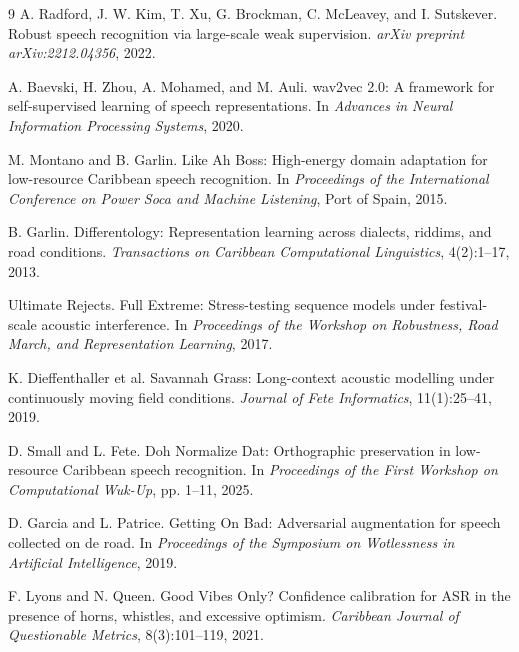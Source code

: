 \documentclass[10pt,twocolumn]{article}
\begin{document}
\balance
\begin{thebibliography}{9}
A. Radford, J. W. Kim, T. Xu, G. Brockman, C. McLeavey, and I. Sutskever.
\newblock Robust speech recognition via large-scale weak supervision.
\newblock \emph{arXiv preprint arXiv:2212.04356}, 2022.

A. Baevski, H. Zhou, A. Mohamed, and M. Auli.
\newblock wav2vec 2.0: A framework for self-supervised learning of speech representations.
\newblock In \emph{Advances in Neural Information Processing Systems}, 2020.

M. Montano and B. Garlin.
\newblock Like Ah Boss: High-energy domain adaptation for low-resource Caribbean speech recognition.
\newblock In \emph{Proceedings of the International Conference on Power Soca and Machine Listening}, Port of Spain, 2015.

B. Garlin.
\newblock Differentology: Representation learning across dialects, riddims, and road conditions.
\newblock \emph{Transactions on Caribbean Computational Linguistics}, 4(2):1--17, 2013.

Ultimate Rejects.
\newblock Full Extreme: Stress-testing sequence models under festival-scale acoustic interference.
\newblock In \emph{Proceedings of the Workshop on Robustness, Road March, and Representation Learning}, 2017.

K. Dieffenthaller et al.
\newblock Savannah Grass: Long-context acoustic modelling under continuously moving field conditions.
\newblock \emph{Journal of Fete Informatics}, 11(1):25--41, 2019.

D. Small and L. Fete.
\newblock Doh Normalize Dat: Orthographic preservation in low-resource Caribbean speech recognition.
\newblock In \emph{Proceedings of the First Workshop on Computational Wuk-Up}, pp. 1--11, 2025.

D. Garcia and L. Patrice.
\newblock Getting On Bad: Adversarial augmentation for speech collected on de road.
\newblock In \emph{Proceedings of the Symposium on Wotlessness in Artificial Intelligence}, 2019.

F. Lyons and N. Queen.
\newblock Good Vibes Only? Confidence calibration for ASR in the presence of horns, whistles, and excessive optimism.
\newblock \emph{Caribbean Journal of Questionable Metrics}, 8(3):101--119, 2021.
\end{thebibliography}
\end{document}
